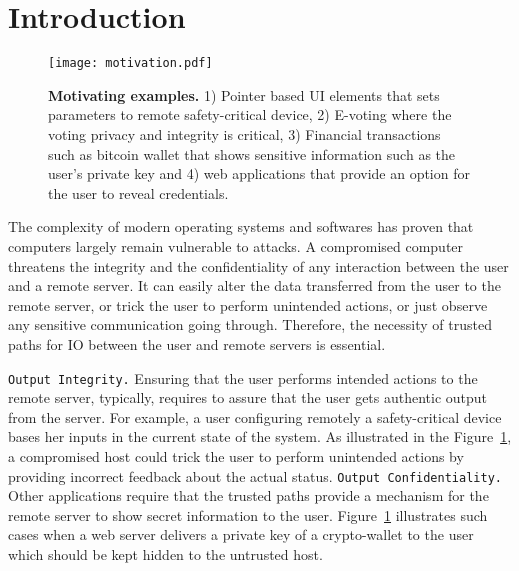 \section{Introduction}
\label{sec:intro}




\begin{figure}[t]
\centering
\texttt{[image: motivation.pdf]}
\caption{\textbf{Motivating examples.} 1) Pointer based UI elements that sets parameters to remote safety-critical device, 2) E-voting where the voting privacy and integrity is critical, 3) Financial transactions such as bitcoin wallet that shows sensitive information such as the user's private key and 4) web applications that provide an option for the user to reveal credentials.}
\spacesave
\label{fig:motivation}
\centering
\end{figure}

The complexity of modern operating systems and softwares has proven that computers largely remain vulnerable to attacks. A compromised computer threatens the integrity and the confidentiality of any interaction between the user and a remote server. It can easily alter the data transferred from the user to the remote server, or trick the user to perform unintended actions, or just observe any sensitive communication going through. Therefore, the necessity of trusted paths for IO between the user and remote servers is essential.

\texttt{Output Integrity.} Ensuring that the user performs intended actions to the remote server, typically, requires to assure that the user gets authentic output from the server. For example, a user configuring remotely a safety-critical device bases her inputs in the current state of the system. As illustrated in the Figure~\ref{fig:motivation}, a compromised host could trick the user to perform unintended actions by providing incorrect feedback about the actual status. \texttt{Output Confidentiality.} Other applications require that the trusted paths provide a mechanism for the remote server to show secret information to the user. Figure~\ref{fig:motivation} illustrates such cases when a web server delivers a private key of a crypto-wallet to the user which should be kept hidden to the untrusted host.

